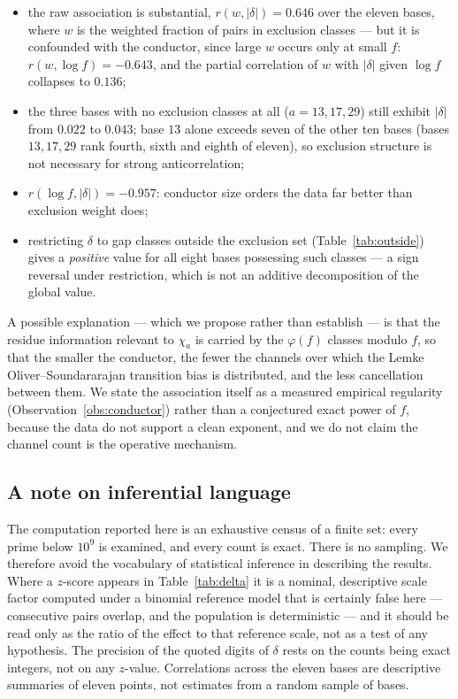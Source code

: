 \documentclass[11pt,reqno]{amsart}
\theoremstyle{plain}
\theoremstyle{definition}
\begin{document}
\begin{itemize}
\item the raw association is substantial, $r(w, |\delta|) = 0.646$ over the
      eleven bases, where $w$ is the weighted fraction of pairs in exclusion
      classes --- but it is confounded with the conductor, since large $w$
      occurs only at small $f$: $r(w, \log f) = -0.643$, and the partial
      correlation of $w$ with $|\delta|$ given $\log f$ collapses to $0.136$;
\item the three bases with no exclusion classes at all ($a = 13, 17, 29$)
      still exhibit $|\delta|$ from $0.022$ to $0.043$; base $13$ alone exceeds
      seven of the other ten bases (bases $13, 17, 29$ rank fourth, sixth and
      eighth of eleven), so exclusion structure is not necessary for strong
      anticorrelation;
\item $r(\log f, |\delta|) = -0.957$: conductor size orders the data far
      better than exclusion weight does;
\item restricting $\delta$ to gap classes outside the exclusion set
      (Table~\ref{tab:outside}) gives a \emph{positive} value for all eight
      bases possessing such classes --- a sign reversal under restriction,
      which is not an additive decomposition of the global value.
\end{itemize}

A possible explanation --- which we propose rather than establish --- is that
the residue information relevant to $\chi_a$ is carried by the $\varphi(f)$
classes modulo $f$, so that the smaller the conductor, the fewer the channels
over which the Lemke Oliver--Soundararajan transition bias is distributed, and
the less cancellation between them. We state the association itself as a
measured empirical regularity (Observation~\ref{obs:conductor}) rather than a
conjectured exact power of $f$, because the data do not support a clean
exponent, and we do not claim the channel count is the operative mechanism.

\subsection*{A note on inferential language}
The computation reported here is an exhaustive census of a finite set: every
prime below $10^9$ is examined, and every count is exact. There is no
sampling. We therefore avoid the vocabulary of statistical inference in
describing the results. Where a $z$-score appears in Table~\ref{tab:delta} it
is a nominal, descriptive scale factor computed under a binomial reference
model that is certainly false here --- consecutive pairs overlap, and the
population is deterministic --- and it should be read only as the ratio of the
effect to that reference scale, not as a test of any hypothesis. The precision
of the quoted digits of $\delta$ rests on the counts being exact integers, not
on any $z$-value. Correlations across the eleven bases are descriptive summaries of
eleven points, not estimates from a random sample of bases.
\end{document}
